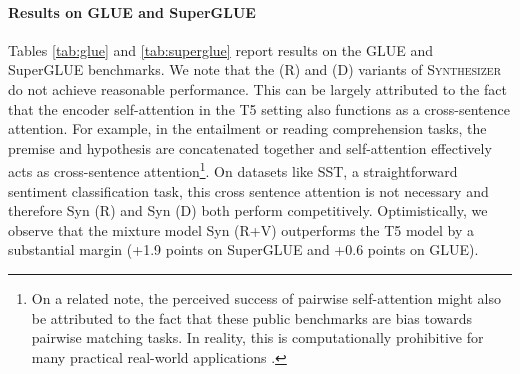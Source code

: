 \documentclass{article} \usepackage{iclr2021_conference,times}
\begin{document}
 



\paragraph{Results on GLUE and SuperGLUE}
Tables \ref{tab:glue} and \ref{tab:superglue} report results on the GLUE and SuperGLUE benchmarks. We note that the (R) and (D) variants of \textsc{Synthesizer} do not achieve reasonable performance. This can be largely attributed to the fact that the encoder self-attention in the T5 setting also functions as a cross-sentence attention. For example, in the entailment or reading comprehension tasks, the premise and hypothesis are concatenated together and self-attention effectively acts as cross-sentence attention\footnote{On a related note, the perceived success of pairwise self-attention might also be attributed to the fact that these public benchmarks are bias towards pairwise matching tasks. In reality, this is computationally prohibitive for many practical real-world applications \citep{seo2018phrase}. }. On datasets like SST, a straightforward sentiment classification task, this cross sentence attention is not necessary and therefore Syn (R) and Syn (D) both perform competitively. Optimistically, we observe that the mixture model Syn (R+V) outperforms the T5 model by a substantial margin (+1.9 points on SuperGLUE and +0.6 points on GLUE).
\end{document}
